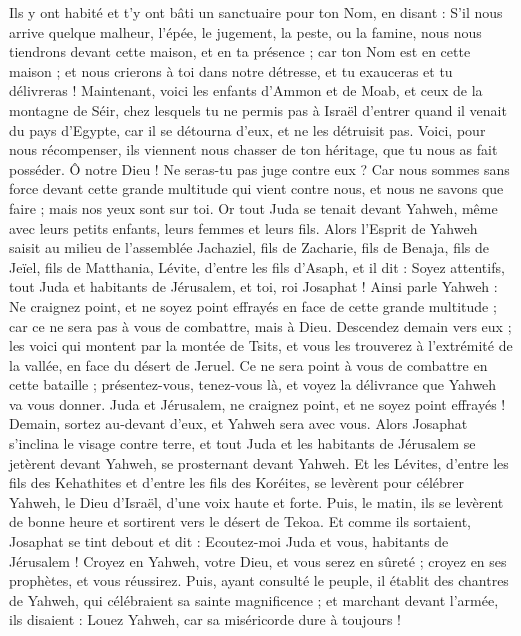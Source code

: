 \begin{multicols}{2}
Ils y ont habité et t'y ont bâti un sanctuaire pour ton Nom, en disant :
S'il nous arrive quelque malheur, l'épée, le jugement, la peste, ou la famine, nous nous tiendrons devant cette maison, et en ta présence ; car ton Nom est en cette maison ; et nous crierons à toi dans notre détresse, et tu exauceras et tu délivreras !
Maintenant, voici les enfants d'Ammon et de Moab, et ceux de la montagne de Séir, chez lesquels tu ne permis pas à Israël d'entrer quand il venait du pays d'Egypte, car il se détourna d'eux, et ne les détruisit pas.
Voici, pour nous récompenser, ils viennent nous chasser de ton héritage, que tu nous as fait posséder.
Ô notre Dieu ! Ne seras-tu pas juge contre eux ? Car nous sommes sans force devant cette grande multitude qui vient contre nous, et nous ne savons que faire ; mais nos yeux sont sur toi.
Or tout Juda se tenait devant Yahweh, même avec leurs petits enfants, leurs femmes et leurs fils.
Alors l'Esprit de Yahweh saisit au milieu de l'assemblée Jachaziel, fils de Zacharie, fils de Benaja, fils de Jeïel, fils de Matthania, Lévite, d'entre les fils d'Asaph,
et il dit : Soyez attentifs, tout Juda et habitants de Jérusalem, et toi, roi Josaphat ! Ainsi parle Yahweh : Ne craignez point, et ne soyez point effrayés en face de cette grande multitude ; car ce ne sera pas à vous de combattre, mais à Dieu.
Descendez demain vers eux ; les voici qui montent par la montée de Tsits, et vous les trouverez à l'extrémité de la vallée, en face du désert de Jeruel.
Ce ne sera point à vous de combattre en cette bataille ; présentez-vous, tenez-vous là, et voyez la délivrance que Yahweh va vous donner. Juda et Jérusalem, ne craignez point, et ne soyez point effrayés ! Demain, sortez au-devant d'eux, et Yahweh sera avec vous.
Alors Josaphat s'inclina le visage contre terre, et tout Juda et les habitants de Jérusalem se jetèrent devant Yahweh, se prosternant devant Yahweh.
Et les Lévites, d'entre les fils des Kehathites et d'entre les fils des Koréites, se levèrent pour célébrer Yahweh, le Dieu d'Israël, d'une voix haute et forte.
Puis, le matin, ils se levèrent de bonne heure et sortirent vers le désert de Tekoa. Et comme ils sortaient, Josaphat se tint debout et dit : Ecoutez-moi Juda et vous, habitants de Jérusalem ! Croyez en Yahweh, votre Dieu, et vous serez en sûreté ; croyez en ses prophètes, et vous réussirez.
Puis, ayant consulté le peuple, il établit des chantres de Yahweh, qui célébraient sa sainte magnificence ; et marchant devant l'armée, ils disaient : Louez Yahweh, car sa miséricorde dure à toujours !

\end{multicols}
